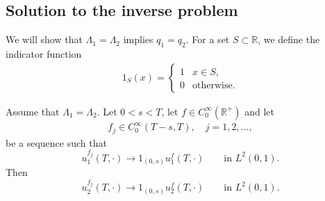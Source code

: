 \documentclass[12pt,oneside,final]{amsart}
\newcommand{\HOX}[1]{\todo[noline,color=white,size=\footnotesize]{#1}}
\def\R{\mathbb R}
\begin{document}
\subsection{Solution to the inverse problem}

We will show that $\Lambda_1=\Lambda_2$ implies $q_1=q_2$. 
For a set $S \subset \R$, we define the indicator function
	\begin{align*}
1_S(x) = \begin{cases}
1 & x \in S, \\
0 & \text{otherwise}.
\end{cases}
	\end{align*}

\begin{lemma}\label{lem_of_norm_conv_of_sol_1d}
Assume that $\Lambda_1 = \Lambda_2$.
	Let $0<s<T$, let $f \in C_0^\infty(\R^+)$ and let
	\begin{align*}
f_j \in C_0^\infty(T-s, T), \quad j=1,2,\dots,
	\end{align*}
be a sequence such that
	\begin{equation}\label{conv_cutoff}
		u_1^{f_j}(T,\cdot) \rightarrow 1_{(0,s)}u_1^f(T,\cdot) \qquad \text{in } L^2(0,1).
	\end{equation}
	Then
	\begin{equation*}
		u_2^{f_j}(T,\cdot) \rightarrow 1_{(0,s)}u_2^f(T,\cdot) \qquad \text{in } L^2(0,1).
	\end{equation*}
\end{lemma}
\end{document}
